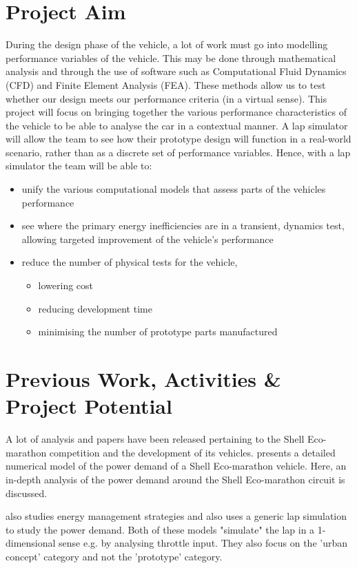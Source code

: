 \documentclass{article}
\begin{document}
\section{Project Aim}
During the design phase of the vehicle, a lot of work must go into modelling performance variables of the vehicle. This may be done through mathematical analysis and through the use of software such as Computational Fluid Dynamics (CFD) and Finite Element Analysis (FEA). These methods allow us to test whether our design meets our performance criteria (in a virtual sense). This project will focus on bringing together the various performance characteristics of the vehicle to be able to analyse the car in a contextual manner. A lap simulator will allow the team to see how their prototype design will function in a real-world scenario, rather than as a discrete set of performance variables. Hence, with a lap simulator the team will be able to:
\begin{itemize}
	\item unify the various computational models that assess parts of the vehicles performance
	\item see where the primary energy inefficiencies are in a transient, dynamics test, allowing targeted improvement of the vehicle's performance
	\item reduce the number of physical tests for the vehicle,
	      \begin{itemize}
		      \item lowering cost
		      \item reducing development time
		      \item minimising the number of prototype parts manufactured
	      \end{itemize}
\end{itemize}
\section{Previous Work, Activities \& Project Potential}
A lot of analysis and papers have been released pertaining to the Shell Eco-marathon competition and the development of its vehicles. \citep{Stabile2021} presents a detailed numerical model of the power demand of a Shell Eco-marathon vehicle. Here, an in-depth analysis of the power demand around the Shell Eco-marathon circuit is discussed.

\citep{Punov2021} also studies energy management strategies and also uses a generic lap simulation to study the power demand. Both of these models "simulate" the lap in a 1-dimensional sense e.g. by analysing throttle input. They also focus on the 'urban concept' category and not the 'prototype' category.
\end{document}
